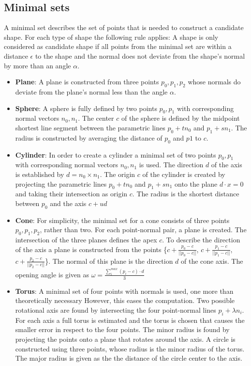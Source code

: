 \subsection{Minimal sets}
A minimal set describes the set of points that is needed to construct a candidate shape. 
For each type of shape the following rule applies: A shape is only considered as candidate shape if all points from the minimal set are within a distance $\epsilon$ to the shape and the normal does not deviate from the shape's normal by more than an angle $\alpha$. 

\begin{itemize}
	\item \textbf{Plane}: A plane is constructed from three points $p_0, p_1, p_2$ whose normals do deviate from the plane's normal less than the angle $\alpha$. 
	
	\item \textbf{Sphere}: A sphere is fully defined by two points $p_0, p_1$ with corresponding normal vectors $n_0, n_1$. The center $c$ of the sphere is defined by the midpoint shortest line segment between the parametric lines $p_0 + tn_0$ and $p_1 + sn_1$. The radius is constructed by averaging the distance of $p_0$ and $p1$ to $c$.

	\item \textbf{Cylinder}:
	In order to create a cylinder a minimal set of two points  $p_0, p_1$ with corresponding normal vectors $n_0, n_1$ is used. The direction $d$ of the axis is established by $d = n_0 \times n_1$. The origin $c$ of the cylinder is created by projecting the parametric lines $p_0 + tn_0$ and $p_1 + sn_1$ onto the plane $d \cdot x = 0$ and taking their intersection as origin $c$. The radius is the shortest distance between $p_0$ and the axis $c + ud$
	
	\item \textbf{Cone}:
	For simplicity, the minimal set for a cone consists of three points $p_0, p_1, p_2$, rather than two. For each point-normal pair, a plane is created. The intersection of the three planes defines the apex $c$. To describe the direction of the axis a plane is constructed from the points \{$c +  \frac{p_0 - c}{||p_0 - c||}$, $c +  \frac{p_1 - c}{||p_1 - c||}$, $c +  \frac{p_2 - c}{||p_2 - c||}$\}. The normal of this plane is the direction $d$ of the cone axis. The opening angle is given as $\omega = \frac{\sum_{i}^{max} (p_i - c)\cdot d}{3}$
	
	\item \textbf{Torus}:
	A minimal set of four points with normals is used, one more than theoretically necessary However, this eases the computation.
	Two possible rotational axis are found by intersecting the four point-normal lines $p_i +  \lambda n_i$\cite{marshall2001robust}. For each axis a full torus is estimated and the torus is chosen that causes the smaller error in respect to the four points. The minor radius is found by projecting the points onto a plane that rotates around the axis. A circle is constructed using three points, whose radius is the minor radius of the torus. The major radius is given as the the distance of the circle center to the axis. 


\end{itemize} 


